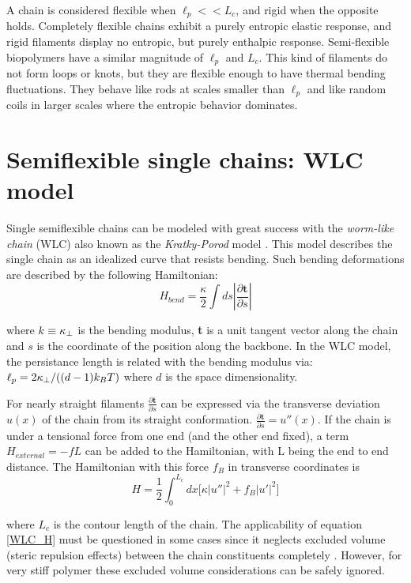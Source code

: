 A chain is considered flexible when $\ell_p<<L_c$, and rigid when the opposite
holds. Completely flexible chains exhibit a purely entropic elastic
response, and rigid filaments display no entropic, but purely enthalpic
response. Semi-flexible biopolymers have a similar magnitude of $\ell_p$ and
$L_c$. This kind of filaments do not form loops or knots, but they are
flexible enough to have thermal bending
fluctuations\citep{storm_nonlinear_2005}. They behave like rods at scales
smaller than $\ell_p$ and like random coils in larger scales where the entropic behavior
dominates.

\section{Semiflexible single chains: WLC model}
Single semiflexible chains can be modeled with great success with the
\emph{worm-like chain} (WLC) also known as the \emph{Kratky-Porod} model
\citep{rubinstein_polymer_2003, schuster_hierarchical_2011}. This model
describes the single chain as an idealized curve that resists bending. Such
bending deformations are described by the following Hamiltonian:
$$H_{bend}=\frac{\kappa}{2} \int ds|\frac{\partial \textbf{t}}{\partial s}|$$

where $k\equiv\kappa_\perp{}$ is the bending modulus, \textbf{t} is a unit tangent
vector along the chain and $s$ is the coordinate of the position along the
backbone. In the WLC model, the persistance length is related with the bending
modulus via: $\ell_p{}=2\kappa_\perp{}/((d-1)k_B{}T)$ where $d$ is the space
dimensionality.

For nearly straight filaments $\frac{\partial \textbf{t}}{\partial s}$ can be
expressed via the transverse deviation $u(x)$ of the chain from its straight
conformation. $\frac{\partial \textbf{t}}{\partial s}=u''(x)$. If the chain is
under a tensional force from one end (and the other end fixed), a
term $H_{external}=-fL$ can be added to the Hamiltonian, with L being the end to end
distance.
The Hamiltonian with this force $f_B$ in transverse coordinates is
\begin{equation}\label{WLC_H}
H=\frac{1}{2}\int_0^{L_c} dx\Big[\kappa|u''|^2 + f_B|u'|^2\Big]
\end{equation}

where $L_c$ is the contour length of the chain.
The applicability of equation \ref{WLC_H} must be questioned in some cases since
it neglects excluded volume (steric repulsion effects) between the
chain constituents completely \citep{hsu_breakdown_2011}. However, for very stiff
polymer these excluded volume considerations can be safely ignored.

